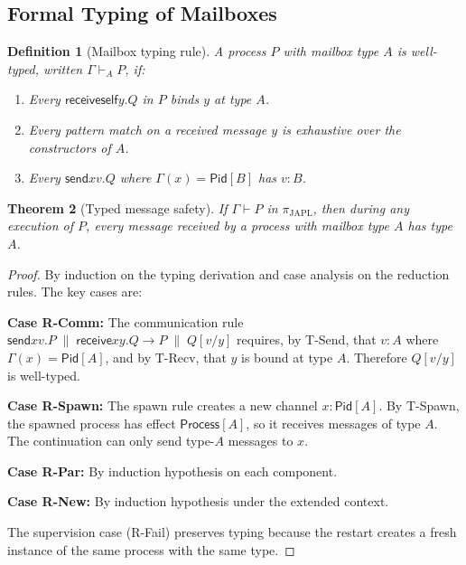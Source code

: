 \documentclass[11pt,a4paper]{article}
\newtheorem{theorem}{Theorem}[section]
\newtheorem{definition}[theorem]{Definition}
\newcommand{\ppar}{\;\|\;}
\newcommand{\Pid}{\mathsf{Pid}}
\newcommand{\sendf}{\mathsf{send}}
\newcommand{\recvf}{\mathsf{receive}}
\begin{document}
\subsection{Formal Typing of Mailboxes}

\begin{definition}[Mailbox typing rule]\label{def:mailbox-typing}
A process $P$ with mailbox type $A$ is well-typed, written $\Gamma \vdash_A P$, if:
\begin{enumerate}
\item Every $\recvf{\mathsf{self}}{y}.Q$ in $P$ binds $y$ at type $A$.
\item Every pattern match on a received message $y$ is exhaustive over the constructors of $A$.
\item Every $\sendf{x}{v}.Q$ where $\Gamma(x) = \Pid[B]$ has $v : B$.
\end{enumerate}
\end{definition}

\begin{theorem}[Typed message safety]\label{thm:msg-safety}
If $\Gamma \vdash P$ in $\pi_{\text{JAPL}}$, then during any execution of $P$, every message received by a process with mailbox type $A$ has type $A$.
\end{theorem}

\begin{proof}
By induction on the typing derivation and case analysis on the reduction rules. The key cases are:

\textbf{Case R-Comm:} The communication rule $\sendf{x}{v}.P \ppar \recvf{x}{y}.Q \rightarrow P \ppar Q[v/y]$ requires, by T-Send, that $v : A$ where $\Gamma(x) = \Pid[A]$, and by T-Recv, that $y$ is bound at type $A$. Therefore $Q[v/y]$ is well-typed.

\textbf{Case R-Spawn:} The spawn rule creates a new channel $x : \Pid[A]$. By T-Spawn, the spawned process has effect $\mathsf{Process}[A]$, so it receives messages of type $A$. The continuation can only send type-$A$ messages to $x$.

\textbf{Case R-Par:} By induction hypothesis on each component.

\textbf{Case R-New:} By induction hypothesis under the extended context.

The supervision case (R-Fail) preserves typing because the restart creates a fresh instance of the same process with the same type.
\end{proof}


\end{document}

